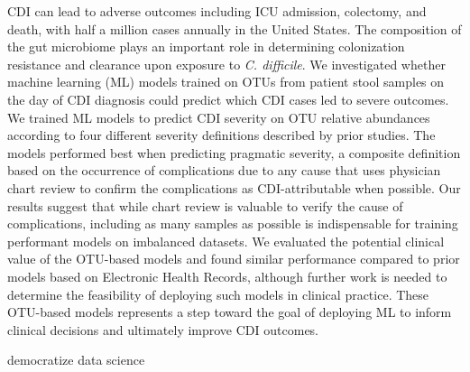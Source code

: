 CDI can lead to adverse outcomes including ICU admission, colectomy, and death,
with half a million cases annually in the United States.
The composition of the gut microbiome plays an important role in determining
colonization resistance and clearance upon exposure to \textit{C. difficile}.
We investigated whether machine learning (ML) models trained on OTUs from patient
stool samples on the day of CDI diagnosis could predict which CDI cases
led to severe outcomes.
We trained ML models to predict CDI severity on OTU relative abundances
according to four different severity definitions described by prior studies.
The models performed best when predicting pragmatic severity, a composite
definition based on the occurrence of complications due to any cause that uses
physician chart review to confirm the complications as CDI-attributable when
possible.
Our results suggest that while chart review is valuable to verify the cause of
complications, including as many samples as possible is indispensable for
training performant models on imbalanced datasets.
We evaluated the potential clinical value of the OTU-based models and
found similar performance compared to prior models based on Electronic Health
Records, although further work is needed to determine the feasibility of
deploying such models in clinical practice.
These OTU-based models represents a step toward the goal of deploying ML to
inform clinical decisions and ultimately improve CDI outcomes.

democratize data science